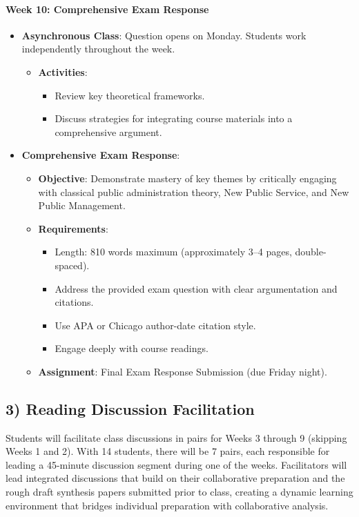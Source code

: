\documentclass[11pt]{article}     %
\begin{document}
\paragraph{Week 10: Comprehensive Exam Response}
\begin{itemize}
    \item \textbf{Asynchronous Class}: Question opens on Monday. Students work independently throughout the week.
    \begin{itemize}
        \item \textbf{Activities}:
        \begin{itemize}
            \item Review key theoretical frameworks.
            \item Discuss strategies for integrating course materials into a comprehensive argument.
        \end{itemize}
    \end{itemize}
    \item \textbf{Comprehensive Exam Response}:
    \begin{itemize}
        \item \textbf{Objective}: Demonstrate mastery of key themes by critically engaging with classical public administration theory, New Public Service, and New Public Management.
        \item \textbf{Requirements}:
        \begin{itemize}
            \item Length: 810 words maximum (approximately 3--4 pages, double-spaced).
            \item Address the provided exam question with clear argumentation and citations.
            \item Use APA or Chicago author-date citation style.
            \item Engage deeply with course readings.
        \end{itemize}
        \item \textbf{Assignment}: Final Exam Response Submission (due Friday night).
    \end{itemize}
\end{itemize}

\subsection*{3) Reading Discussion Facilitation}

Students will facilitate class discussions in pairs for Weeks 3 through 9 (skipping Weeks 1 and 2). With 14 students, there will be 7 pairs, each responsible for leading a 45-minute discussion segment during one of the weeks. Facilitators will lead integrated discussions that build on their collaborative preparation and the rough draft synthesis papers submitted prior to class, creating a dynamic learning environment that bridges individual preparation with collaborative analysis.
\end{document}
